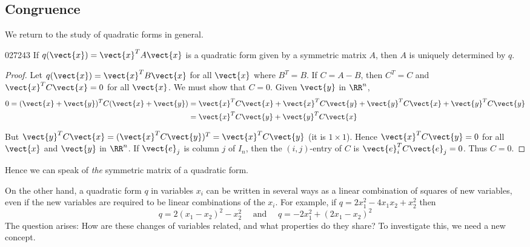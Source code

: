 \subsection*{Congruence}

We return to the study of quadratic forms in general.


\begin{theorem}{}{027243}
If $q(\vect{x}) = \vect{x}^{T}A\vect{x}$ is a quadratic form given by a symmetric matrix $A$, then $A$ is uniquely determined by $q$.
\end{theorem}

\begin{proof}
Let $q(\vect{x}) = \vect{x}^{T}B\vect{x}$ for all $\vect{x}$ where $B^{T} = B$. If $C = A - B$, then $C^{T} = C$ and $\vect{x}^{T}C\vect{x} = 0$ for all $\vect{x}$. We must show that $C = 0$. Given $\vect{y}$ in $\RR^n$,
\begin{align*}
0 = (\vect{x} + \vect{y})^TC(\vect{x} + \vect{y}) &= \vect{x}^TC\vect{x} + \vect{x}^TC\vect{y} + \vect{y}^TC\vect{x} + \vect{y}^TC\vect{y} \\
&= \vect{x}^TC\vect{y} + \vect{y}^TC\vect{x}
\end{align*}

But $\vect{y}^{T}C\vect{x} = (\vect{x}^{T}C\vect{y})^{T} = \vect{x}^{T}C\vect{y}$ (it is $1 \times 1$). Hence $\vect{x}^{T}C\vect{y} = 0$ for all $\vect{x}$ and $\vect{y}$ in $\RR^n$. If $\vect{e}_{j}$ is column $j$ of $I_{n}$, then the $(i, j)$-entry of $C$ is $\vect{e}_{i}^{T}C\vect{e}_{j} = 0$. Thus $C = 0$.
\end{proof}

\noindent Hence we can speak of \textit{the} symmetric matrix of a quadratic form.


On the other hand, a quadratic form $q$ in variables $x_{i}$ can be written in several ways as a linear combination of squares of new variables, even if the new variables are required to be linear combinations of the $x_{i}$. For example, if $q = 2x_{1}^2 - 4x_{1}x_{2} + x_{2}^2$ then
\begin{equation*}
q = 2(x_{1} - x_{2})^2 - x_{2}^2 \quad \mbox{ and } \quad q = -2x_{1}^2 + (2x_{1} - x_{2})^2
\end{equation*}
The question arises: How are these changes of variables related, and what properties do they share? To investigate this, we need a new concept.


